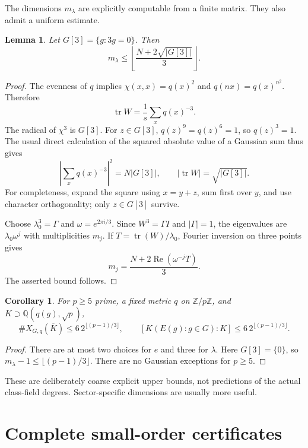 \documentclass[11pt]{article}
\newtheorem{lemma}[theorem]{Lemma}
\newtheorem{corollary}[theorem]{Corollary}
\theoremstyle{remark}
\newcommand{\Q}{\mathbb Q}
\newcommand{\Z}{\mathbb Z}
\newcommand{\tr}{\operatorname{tr}}
\begin{document}
The dimensions $m_\lambda$ are explicitly computable from a finite matrix.
They also admit a uniform estimate.
\begin{lemma}\label{lem:mult}
Let $G[3]=\{g:3g=0\}$. Then
\[
 m_\lambda\le\left\lfloor\frac{N+2\sqrt{|G[3]|}}3\right\rfloor.
\]
\end{lemma}
\begin{proof}
The evenness of $q$ implies $\chi(x,x)=q(x)^2$ and $q(nx)=q(x)^{n^2}$.
Therefore
\[
 \tr W=\frac1s\sum_xq(x)^{-3}.
\]
The radical of $\chi^3$ is $G[3]$. For $z\in G[3]$, $q(z)^9=q(z)^6=1$,
so $q(z)^3=1$. The usual direct calculation of the squared absolute value of
a Gaussian sum thus gives
\[
 \left|\sum_xq(x)^{-3}\right|^2=N|G[3]|,
 \qquad |\tr W|=\sqrt{|G[3]|}.
\]
For completeness, expand the square using $x=y+z$, sum first over $y$, and
use character orthogonality; only $z\in G[3]$ survive.

Choose $\lambda_0^3=\Gamma$ and $\omega=e^{2\pi i/3}$. Since $W^3=\Gamma I$
and $|\Gamma|=1$, the eigenvalues are $\lambda_0\omega^j$ with multiplicities
$m_j$. If $T=\tr(W)/\lambda_0$, Fourier inversion on three points gives
\[
 m_j=\frac{N+2\operatorname{Re}(\omega^{-j}T)}3.
\]
The asserted bound follows.
\end{proof}

\begin{corollary}\label{cor:primebound}
For $p\ge5$ prime, a fixed metric $q$ on $\Z/p\Z$, and
$K\supset\Q(q(g),\sqrt p)$,
\[
 \#X_{G,q}(\overline K)\le
 6\,2^{\lfloor(p-1)/3\rfloor},\qquad
 [K(E(g):g\in G):K]\le6\,2^{\lfloor(p-1)/3\rfloor}.
\]
\end{corollary}
\begin{proof}
There are at most two choices for $e$ and three for $\lambda$.
Here $G[3]=\{0\}$, so $m_\lambda-1\le\lfloor(p-1)/3\rfloor$.
There are no Gaussian exceptions for $p\ge5$.
\end{proof}
These are deliberately coarse explicit upper bounds, not predictions of the
actual class-field degrees. Sector-specific dimensions are usually more useful.

\section{Complete small-order certificates}\label{sec:small}
\end{document}
